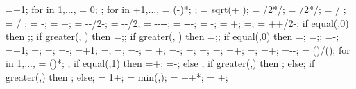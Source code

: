 {{=+1;
for \idefl in {1,...,{}}{
	 = 0;
};
for \idefl in {+1,...,{\levelnumber}}{
	 = (\idefl-)*\drift;
};
\tempdim = sqrt( + );
\fixbeamx = \collinet/2*/\tempdim;
\fixbeamy = \collinet/2*/\tempdim;
 =  / \storyheight * \baywidth;
 =  / \storyheight * \baywidth;
\rigbasestartx = -\supportwidth;
\rigbaseendx = \x{\columnnumber}+\supportwidth;
\isoboty = -\supportheight-\baselinet/2-\isolationdepth;
\isotopy = -\supportheight-\baselinet/2;
\foundboty = -\supportheight-\baselinet-\isolationdepth-\foundationdepth;
\foundtopy = -\supportheight-\baselinet-\isolationdepth;
\foundstartx = -\foundsidew;
\foundendx = \x{\columnnumber}+\foundsidew;
\structheight=\storynumber*\storyheight;
\isomidy = \supportheight+\isolinet+\isolationdepth/2-\baselinet;
if equal(\subfloors,0) then {;};
if greater(\leftstory, \subfloors) then {\leftstory=\subfloors;};
if greater(\rightstory, \subfloors) then {\rightstory=\subfloors;};
if equal(\showopenstory,0) then
{\leftstory=\subfloors;
\rightstory=\subfloors;};
\leftopenstory=\subfloors-\leftstory;
\leftlevel=\leftstory+1;
\leftwallh=\leftstory*\storyheight;
\leftopenh=\leftopenstory*\storyheight;
\rightopenstory=\subfloors-\rightstory;
\rightlevel=\rightstory+1;
\rightwallh=\rightstory*\storyheight;
\rightopenh=\rightopenstory*\storyheight;
\diffwallh=\leftwallh-\rightwallh;
\soilbelowfoundtof = \soilbelowfound+\supportheight;
\basewallstartx=-\supportwidth;
\buildingwidth=\baynumber*\baywidth;
\basewalldepth=\subfloors*\storyheight;
\basewallstarty=\basewalldepth;
\basewallendx=\buildingwidth+\supportwidth;
\basewallendy=\basewallstarty;
\rightsoilx=\buildingwidth+\rightsoildist;
\rightsoily=\rightwallh-\rightsoildepth-\supportheight;
\isospace = (\buildingwidth)/();
for \kiso in {1,...,{\numberofisolators}}{
\xiso{\kiso} = ()*\isospace;
};
if equal(\isoshiftyn,1) then
{=+\isoshift;
\xiso{\numberofisolators}=\xiso{\numberofisolators}-\isoshift;}
else {};
if greater(\doflocfloor,\storynumber) then {;} else{};
if greater(\dofloccolumn,\columnnumber) then {;} else{};
\dofloch = 1+\doflocfloor;
\minlen = min(\storyheight,\baywidth);
\dofxx = \x{\dofloccolumn}+\dofoffsetratio*\minlen+*\showdefl;
\dofyy = \y{\dofloch}+\dofoffsetratio*\minlen;
}}
